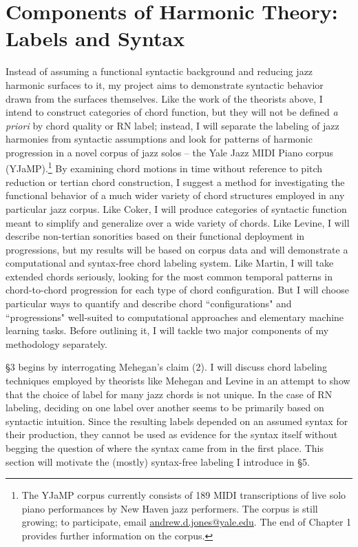 \section{Components of Harmonic Theory: Labels and Syntax}
Instead of assuming a functional syntactic background and reducing jazz harmonic surfaces to it, my project aims to demonstrate syntactic behavior drawn from the surfaces themselves.  Like the work of the theorists above, I intend to construct categories of chord function, but they will not be defined \emph{a priori} by chord quality or RN label; instead, I will separate the labeling of jazz harmonies from syntactic assumptions and look for patterns of harmonic progression in a novel corpus of jazz solos -- the Yale Jazz MIDI Piano corpus (YJaMP).\footnote{The YJaMP corpus currently consists of 189 MIDI transcriptions of live solo piano performances by New Haven jazz performers.  The corpus is still growing; to participate, email \href{mailto:andrew.d.jones@yale.edu}{andrew.d.jones@yale.edu}.  The end of Chapter 1 provides further information on the corpus.}  By examining chord motions in time without reference to pitch reduction or tertian chord construction, I suggest a method for investigating the functional behavior of a much wider variety of chord structures employed in any particular jazz corpus.  Like Coker, I will produce categories of syntactic function meant to simplify and generalize over a wide variety of chords.  Like Levine, I will describe non-tertian sonorities based on their functional deployment in progressions, but my results will be based on corpus data and will demonstrate a computational and syntax-free chord labeling system.  Like Martin, I will take extended chords seriously, looking for the most common temporal patterns in chord-to-chord progression for each type of chord configuration.  But I will choose particular ways to quantify and describe chord ``configurations" and ``progressions" well-suited to computational approaches and elementary machine learning tasks.  Before outlining it, I will tackle two major components of my methodology separately.

\S 3 begins by interrogating Mehegan's claim (2).  I will discuss chord labeling techniques employed by theorists like Mehegan and Levine in an attempt to show that the choice of label for many jazz chords is not unique.  In the case of RN labeling, deciding on one label over another seems to be primarily based on syntactic intuition.  Since the resulting labels depended on an assumed syntax for their production, they cannot be used as evidence for the syntax itself without begging the question of where the syntax came from in the first place.  This section will motivate the (mostly) syntax-free labeling I introduce in \S 5.

